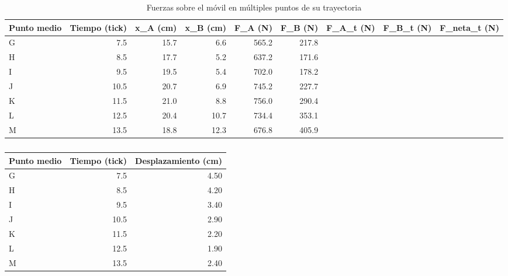 \documentclass[../main.tex]{subfiles}
\begin{document}
\begin{table}
  \caption{Fuerzas sobre el móvil en múltiples puntos de su trayectoria}
  \label{tab:forces}
  \begin{center}
    \begin{tabular}[c]{lrrrrrrrr}
      \toprule
      \multicolumn{1}{c}{\textbf{Punto medio}} &
      \multicolumn{1}{c}{\textbf{Tiempo} (tick)} &
      \multicolumn{1}{c}{\textbf{x_{A}} (\unit{\centi\metre})} &
      \multicolumn{1}{c}{\textbf{x_{B}} (\unit{\centi\metre})} &
      \multicolumn{1}{c}{\textbf{F_{A}} (\unit{\newton})} &
      \multicolumn{1}{c}{\textbf{F_{B}} (\unit{\newton})} &
      \multicolumn{1}{c}{\textbf{F_{A_{t}}} (\unit{\newton})} &
      \multicolumn{1}{c}{\textbf{F_{B_{t}}} (\unit{\newton})} &
      \multicolumn{1}{c}{\textbf{F_{neta_{t}}} (\unit{\newton})} \\
      \midrule
      G & \num{7,5} & \num{15,7} & \num{6,6} & \num{565,2} & \num{217,8} & \num{} & \num{} & \num{} \\
      H & \num{8,5} & \num{17,7} & \num{5,2} & \num{637,2} & \num{171,6} & \num{} & \num{} & \num{} \\
      I & \num{9,5} & \num{19,5} & \num{5,4} & \num{702,0} & \num{178,2} & \num{} & \num{} & \num{} \\
      J & \num{10,5} & \num{20,7} & \num{6,9} & \num{745,2} & \num{227,7} & \num{} & \num{} & \num{} \\
      K & \num{11,5} & \num{21,0} & \num{8,8} & \num{756,0} & \num{290,4} & \num{} & \num{} & \num{} \\
      L & \num{12,5} & \num{20,4} & \num{10,7} & \num{734,4} & \num{353,1} & \num{} & \num{} & \num{} \\
      M & \num{13,5} & \num{18,8} & \num{12,3} & \num{676,8} & \num{405,9} & \num{} & \num{} & \num{} \\
      \bottomrule
    \end{tabular}
  \end{center}
\end{table}
\begin{table}
  \caption{}
  \label{tab:}
  \begin{center}
    \begin{tabular}[c]{lrr}
      \toprule
      \multicolumn{1}{c}{\textbf{Punto medio}} &
      \multicolumn{1}{c}{\textbf{Tiempo (tick)}} &
      \multicolumn{1}{c}{\textbf{Desplazamiento (\unit{\centi\metre})}} \\
      \midrule
      G & \num{7,5} & \num{4,50} \\
      H & \num{8,5} & \num{4,20} \\
      I & \num{9,5} & \num{3,40} \\
      J & \num{10,5}& \num{2,90} \\
      K & \num{11,5}& \num{2,20} \\
      L & \num{12,5}& \num{1,90} \\
      M & \num{13,5}& \num{2,40} \\
    \end{tabular}
  \end{center}
\end{table}
\end{document}

